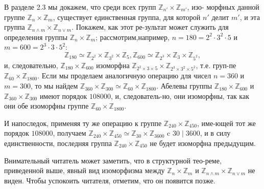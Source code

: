   В разделе 2.3 мы докажем, что среди всех групп $\mathbb{Z}_{n'} \times \mathbb{Z}_{m'}$, изо- \linebreak морфных данной группе $\mathbb{Z}_{n} \times \mathbb{Z}_{m}$, существует единственная группа, для \linebreak которой $n'$ делит $m'$, и эта группа $\mathbb{Z}_{n \wedge m} \times \mathbb{Z}_{n \vee m}$. Покажем, как этот ре-\linebreak зультат может служить для определения группы  $\mathbb{Z}_{n} \times \mathbb{Z}_{m}$; рассмотрим,\linebreak например, $n=180=2^2 \cdot 3^2 \cdot 5$ и $m=600=2^3 \cdot 3 \cdot 5^2$:
$$\mathbb{Z}_{180} \simeq \mathbb{Z}_{2^2} \times \mathbb{Z}_{3^2} \times \mathbb{Z}_{5}, \mathbb{Z}_{600} \simeq \mathbb{Z}_{2^3} \times \mathbb{Z}_{3} \times \mathbb{Z}_{5^2},$$
и, следовательно, $\mathbb{Z}_{180} \times \mathbb{Z}_{600}$ изоморфна $\mathbb{Z}_{2^2 \times 3 \times 5} \times \mathbb{Z}_{2^3 \times 3^2 \times 5^2}$, т.е. груп-\linebreak пе $\mathbb{Z}_{60}\times \mathbb{Z}_{1800}$. Если мы проделаем аналогичную операцию для чисел \linebreak $n = 360$ и $m = 300$, то мы найдем $\mathbb{Z}_{360} \times \mathbb{Z}_{300} \simeq \mathbb{Z}_{60} \times \mathbb{Z}_{1800}$. Абелевы \linebreak группы $\mathbb{Z}_{180} \times \mathbb{Z}_{600}$ и $\mathbb{Z}_{360}\times \mathbb{Z}_{300}$ имеют порядок $108000$, и, следователь-\linebreak но, они изоморфны, так как они обе изоморфны группе $\mathbb{Z}_{60} \times \mathbb{Z}_{1800}$.
  
  И напоследок, применяя ту же операцию к группе $\mathbb{Z}_{240} \times \mathbb{Z}_{450}$, име-\linebreak ющей тот же порядок $108000$, получаем $\mathbb{Z}_{240} \times \mathbb{Z}_{450} \simeq \mathbb{Z}_{30} \times \mathbb{Z}_{3600}$ c \linebreak $30 \mid 3600$, и в силу единственности, последняя группа $\mathbb{Z}_{240} \times \mathbb{Z}_{450}$ не \linebreak будет изоморфна предыдущим.
  
  Внимательный читатель может заметить, что в структурной тео-\linebreak реме, приведенной выше, явный вид изоморфизма между $\mathbb{Z}_{n}\times \mathbb{Z}_{m}$ и \linebreak $\mathbb{Z}_{n \wedge m} \times \mathbb{Z}_{n \vee m}$ не виден. Чтобы успокоить читателя, отметим, что он \linebreak появится позже. \newpage
